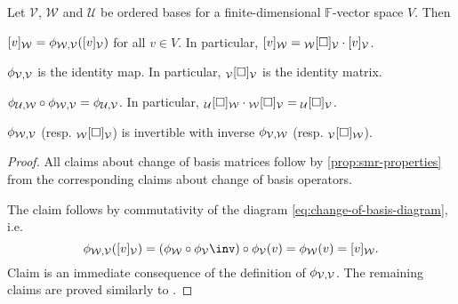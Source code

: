 \documentclass[a4paper, 11pt]{memoir}
\numberwithin{equation}{chapter}
\newcommand{\calV}{\mathcal{V}}
\newcommand{\calW}{\mathcal{W}}
\newcommand{\calU}{\mathcal{U}}
\newcommand{\field}{\mathbb{F}}
\newcommand{\newpar}{\paragraph{}}
\begin{document}
\begin{proposition}
    Let $\calV$, $\calW$ and $\calU$ be ordered bases for a finite-dimensional $\field$-vector space $V$. Then
    \begin{enumprop}
        \item \label{enum:basis-change-coordvec} $\coordvec{v}{\calW} = \basischange{\calW}{\calV} (\coordvec{v}{\calV})$ for all $v \in V$. In particular, $\coordvec{v}{\calW} = \basischangemat{\calW}{\calV} \cdot \coordvec{v}{\calV}$.

        \item \label{enum:basis-change-identity-map} $\basischange{\calV}{\calV}$ is the identity map. In particular, $\basischangemat{\calV}{\calV}$ is the identity matrix.

        \item $\basischange{\calU}{\calW} \circ \basischange{\calW}{\calV} = \basischange{\calU}{\calV}$. In particular, $\basischangemat{\calU}{\calW} \cdot \basischangemat{\calW}{\calV} = \basischangemat{\calU}{\calV}$.

        \item $\basischange{\calW}{\calV}$ (resp. $\basischangemat{\calW}{\calV}$) is invertible with inverse $\basischange{\calV}{\calW}$ (resp. $\basischangemat{\calV}{\calW}$).
    \end{enumprop}
\end{proposition}

\begin{proof}
    All claims about change of basis matrices follow by \cref{prop:smr-properties} from the corresponding claims about change of basis operators.

    The claim  follows by commutativity of the diagram \cref{eq:change-of-basis-diagram}, i.e.
    \begin{equation*}
        \basischange{\calW}{\calV} (\coordvec{v}{\calV})
            = (\coordmap{\calW} \circ \coordmap{\calV}\inv) \circ \coordmap{\calV}(v)
            = \coordmap{\calW}(v)
            = \coordvec{v}{\calW}.
    \end{equation*}
    Claim  is an immediate consequence of the definition of $\basischange{\calV}{\calV}$. The remaining claims are proved similarly to .
\end{proof}


\newpar\label{par:matrix-rep}
\end{document}
